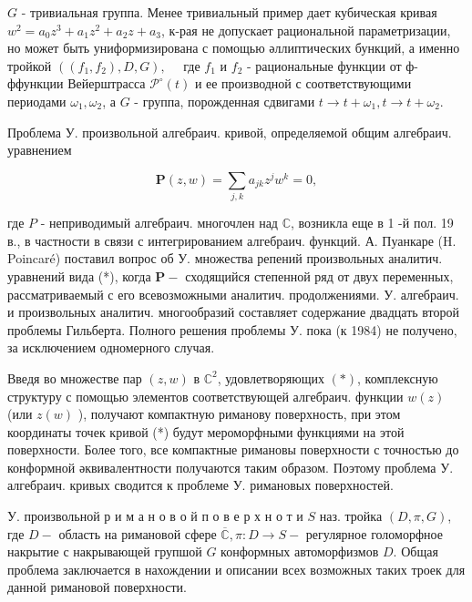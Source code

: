 \documentclass[10pt]{article}
\begin{document}
$G$ - тривиальная группа. Менее тривиальный пример дает кубическая кривая $w^{2}=a_{0} z^{3}+a_{1} z^{2}+a_{2} z+a_{3}$, к-рая не допускает рациональной параметризации, но может быть униформизирована с помощью әллиптических бункций, а именно тройкой $\left(\left(f_{1}, f_{2}\right), D, G\right), \quad$ где $f_{1}$ и $f_{2}$ - рациональные функции от ф-ффункции Вейерштрасса $\mathcal{P}^{\circ}(t)$ и ее производной с соответствующими периодами $\omega_{1}, \omega_{2}$, а $G$ - группа, порожденная сдвигами $t \rightarrow t+\omega_{1}, t \rightarrow t+\omega_{2}$.



Проблема У. произвольной алгебраич. кривой, определяемой общим алгебраич. уравнением



\[

\boldsymbol{P}(z, w)=\sum_{j, k} a_{j k} z^{j} w^{k}=0,

\]



где $P$ - неприводимый алгебраич. многочлен над $\mathbb{C}$, возникла еще в 1 -й пол. 19 в., в частности в связи с интегрированием алгебраич. функций. А. Пуанкаре (H. Poincaré) поставил вопрос об У. множества репений произвольных аналитич. уравнений вида (*), когда $\boldsymbol{P}-$ сходящийся степенной ряд от двух переменных, рассматриваемый с его всевозможными аналитич. продолжениями. У. алгебраич. и произвольных аналитич. многообразий составляет содержание двадцать второй проблемы Гильберта. Полного решения проблемы У. пока (к 1984) не получено, за исключением одномерного случая.



Введя во множестве пар $(z, w)$ в $\mathbb{C}^{2}$, удовлетворяющих $(*)$, комплексную структуру с помощью элементов соответствующей алгебраич. функции $w(z)$ (или $z(w)$ ), получают компактную риманову поверхность, при этом координаты точек кривой (*) будут мероморфными функциями на этой поверхности. Более того, все компактные римановы поверхности с точностью до конформной әквивалентности получаются таким образом. Поэтому проблема У. алгебраич. кривых сводится к проблеме У. римановых поверхностей.



У. произвольной р и м а н о в о й п о в е р х н о т и $S$ наз. тройка $(D, \pi, G)$, где $D-$ область на римановой сфере $\overline{\mathbb{C}}, \pi: D \rightarrow S-$ регулярное голоморфное накрытие с накрывающей групшой $G$ конформных автоморфизмов $D$. Общая проблема заключается в нахождении и описании всех возможных таких троек для данной римановой поверхности.
\end{document}
